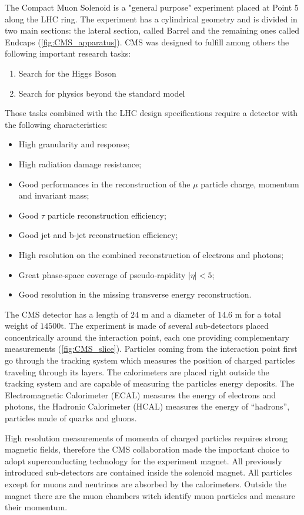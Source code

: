 The Compact Muon Solenoid is a "general purpose" experiment placed at Point 5 along the LHC ring. The experiment has a cylindrical geometry and is divided in two main sections: the lateral section, called Barrel and the remaining ones called Endcaps (\autoref{fig:CMS_apparatus}).   
CMS was designed to fulfill among others the following important research tasks:
\begin{enumerate}
	\item Search for the Higgs Boson
	\item Search for physics beyond the standard model
\end{enumerate}
Those tasks combined with the LHC design specifications require a detector with the following characteristics:
\begin{itemize}
	\item High granularity and response;
	\item High radiation damage resistance;
	\item Good performances in the reconstruction of the $\mu$ particle charge, momentum and invariant mass;
	\item Good $\tau$ particle reconstruction efficiency;
	\item Good jet and b-jet reconstruction efficiency;
	\item High resolution on the combined reconstruction of electrons and photons;
	\item Great phase-space coverage of pseudo-rapidity $|\eta| < 5$;
	\item Good resolution in the missing transverse energy reconstruction.
\end{itemize} 

The CMS detector has a length of $24$ m and a diameter of $14.6$ m for a total weight of $14500 \text{t}$. The experiment is made of several sub-detectors placed concentrically around the interaction point, each one providing complementary measurements (\autoref{fig:CMS_slice}). Particles coming from the interaction point first go through the tracking system which measures the position of charged particles traveling through its layers. The calorimeters are placed right outside the tracking system and are capable of measuring the particles energy deposits. The Electromagnetic Calorimeter (ECAL) measures the energy of electrons and photons, the Hadronic Calorimeter (HCAL) measures the energy of “hadrons”, particles made of quarks and gluons.
 
High resolution measurements of momenta of charged particles requires strong magnetic fields, therefore the CMS collaboration made the important choice to adopt superconducting technology for the experiment magnet. All previously introduced sub-detectors are contained inside the solenoid magnet. All particles except for muons and neutrinos are absorbed by the calorimeters. Outside the magnet there are the muon chambers witch identify muon particles and measure their momentum.

